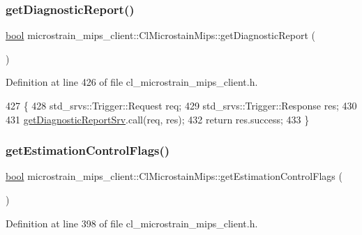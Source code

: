 \subsubsection{\texorpdfstring{get\+Diagnostic\+Report()}{getDiagnosticReport()}}
{\footnotesize\ttfamily \hyperlink{classbool}{bool} microstrain\+\_\+mips\+\_\+client\+::\+Cl\+Microstain\+Mips\+::get\+Diagnostic\+Report (\begin{DoxyParamCaption}{ }\end{DoxyParamCaption})\hspace{0.3cm}{\ttfamily [inline]}}



Definition at line 426 of file cl\+\_\+microstrain\+\_\+mips\+\_\+client.\+h.


\begin{DoxyCode}
427     \{
428         std\_srvs::Trigger::Request req;
429         std\_srvs::Trigger::Response res;
430 
431         \hyperlink{classmicrostrain__mips__client_1_1ClMicrostainMips_ad691fdf83a768d37090963580e187f1e}{getDiagnosticReportSrv}.call(req, res);
432         \textcolor{keywordflow}{return} res.success;
433     \}
\end{DoxyCode}
\mbox{\label{classmicrostrain__mips__client_1_1ClMicrostainMips_a93bbaedd7885cc976b9da4db81a272a6}} 
\subsubsection{\texorpdfstring{get\+Estimation\+Control\+Flags()}{getEstimationControlFlags()}}
{\footnotesize\ttfamily \hyperlink{classbool}{bool} microstrain\+\_\+mips\+\_\+client\+::\+Cl\+Microstain\+Mips\+::get\+Estimation\+Control\+Flags (\begin{DoxyParamCaption}{ }\end{DoxyParamCaption})\hspace{0.3cm}{\ttfamily [inline]}}



Definition at line 398 of file cl\+\_\+microstrain\+\_\+mips\+\_\+client.\+h.


